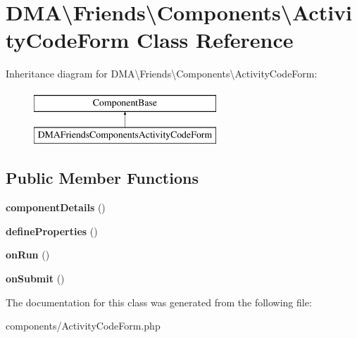 \hypertarget{classDMA_1_1Friends_1_1Components_1_1ActivityCodeForm}{}\section{D\+M\+A\textbackslash{}Friends\textbackslash{}Components\textbackslash{}Activity\+Code\+Form Class Reference}
\label{classDMA_1_1Friends_1_1Components_1_1ActivityCodeForm}
Inheritance diagram for D\+M\+A\textbackslash{}Friends\textbackslash{}Components\textbackslash{}Activity\+Code\+Form\+:\begin{figure}[H]
\begin{center}
\leavevmode
\includegraphics[height=2.000000cm]{df/d99/classDMA_1_1Friends_1_1Components_1_1ActivityCodeForm}
\end{center}
\end{figure}
\subsection*{Public Member Functions}
\begin{DoxyCompactItemize}
\item 
\hypertarget{classDMA_1_1Friends_1_1Components_1_1ActivityCodeForm_a61eb583149b13cc8a195ce40243833e1}{}{\bfseries component\+Details} ()\label{classDMA_1_1Friends_1_1Components_1_1ActivityCodeForm_a61eb583149b13cc8a195ce40243833e1}

\item 
\hypertarget{classDMA_1_1Friends_1_1Components_1_1ActivityCodeForm_a876d1cd4dd4fe69b5ab73288c55371b4}{}{\bfseries define\+Properties} ()\label{classDMA_1_1Friends_1_1Components_1_1ActivityCodeForm_a876d1cd4dd4fe69b5ab73288c55371b4}

\item 
\hypertarget{classDMA_1_1Friends_1_1Components_1_1ActivityCodeForm_a311dc0c41ae9b4c81b62cf5bca11f9b5}{}{\bfseries on\+Run} ()\label{classDMA_1_1Friends_1_1Components_1_1ActivityCodeForm_a311dc0c41ae9b4c81b62cf5bca11f9b5}

\item 
\hypertarget{classDMA_1_1Friends_1_1Components_1_1ActivityCodeForm_af1c607b643b3e629c9854d6d0e21adb8}{}{\bfseries on\+Submit} ()\label{classDMA_1_1Friends_1_1Components_1_1ActivityCodeForm_af1c607b643b3e629c9854d6d0e21adb8}

\end{DoxyCompactItemize}


The documentation for this class was generated from the following file\+:\begin{DoxyCompactItemize}
\item 
components/Activity\+Code\+Form.\+php\end{DoxyCompactItemize}
